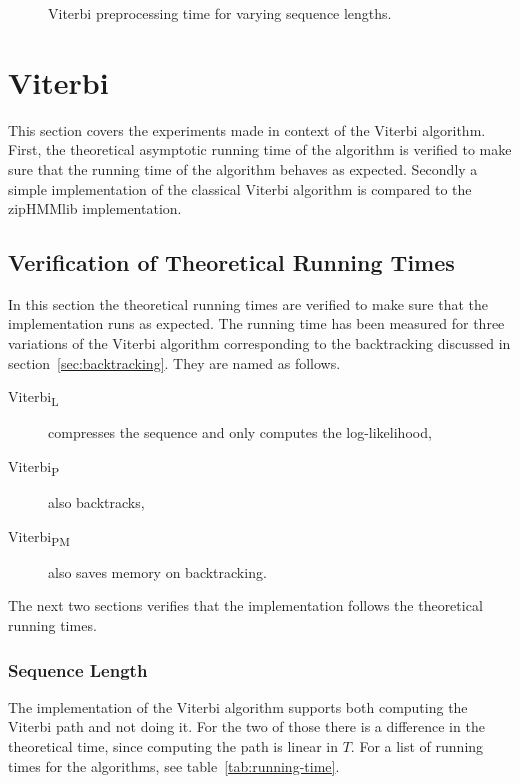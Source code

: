 \begin{figure}
  \centering
  
  \caption{Viterbi preprocessing time for varying sequence lengths.}
  \label{fig:pre_viterbi_T}
\end{figure}

\section{Viterbi}

This section covers the experiments made in context of the Viterbi algorithm.
First, the theoretical asymptotic running time of the algorithm is verified to
make sure that the running time of the algorithm behaves as expected. Secondly
a simple implementation of the classical Viterbi algorithm is compared to the
zipHMMlib implementation.

\subsection{Verification of Theoretical Running Times}
\label{sec:theor-runn-times}

In this section the theoretical running times are verified to make sure that
the implementation runs as expected. The running time has been measured for
three variations of the Viterbi algorithm corresponding to the backtracking
discussed in section~\ref{sec:backtracking}. They are named as follows.
\begin{description}
\item[Viterbi\textsubscript{L}] compresses the sequence and only computes the
  log-likelihood,
\item[Viterbi\textsubscript{P}] also backtracks,
\item[Viterbi\textsubscript{PM}] also saves memory on backtracking.
\end{description}
The next two sections verifies that the implementation follows the theoretical
running times.

\subsubsection{Sequence Length}

The implementation of the Viterbi algorithm supports both computing the Viterbi
path and not doing it. For the two of those there is a difference in the
theoretical time, since computing the path is linear in $T$. For a list of
running times for the algorithms, see table~\ref{tab:running-time}.

